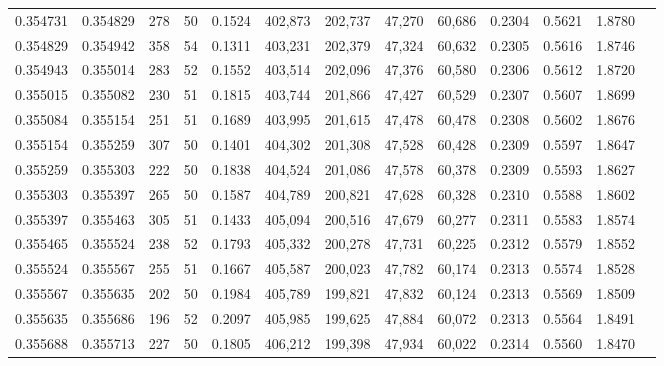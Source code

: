 \begin{tabular}{rrrrrrrrrrrrr}
0.354731 & 0.354829 &   278 &  50 &                                     0.1524 & 402,873 & 202,737 &  47,270 &  60,686 & 0.2304 & 0.5621 & 1.8780 \\
0.354829 & 0.354942 &   358 &  54 &                                     0.1311 & 403,231 & 202,379 &  47,324 &  60,632 & 0.2305 & 0.5616 & 1.8746 \\
0.354943 & 0.355014 &   283 &  52 &                                     0.1552 & 403,514 & 202,096 &  47,376 &  60,580 & 0.2306 & 0.5612 & 1.8720 \\
0.355015 & 0.355082 &   230 &  51 &                                     0.1815 & 403,744 & 201,866 &  47,427 &  60,529 & 0.2307 & 0.5607 & 1.8699 \\
0.355084 & 0.355154 &   251 &  51 &                                     0.1689 & 403,995 & 201,615 &  47,478 &  60,478 & 0.2308 & 0.5602 & 1.8676 \\
0.355154 & 0.355259 &   307 &  50 &                                     0.1401 & 404,302 & 201,308 &  47,528 &  60,428 & 0.2309 & 0.5597 & 1.8647 \\
0.355259 & 0.355303 &   222 &  50 &                                     0.1838 & 404,524 & 201,086 &  47,578 &  60,378 & 0.2309 & 0.5593 & 1.8627 \\
0.355303 & 0.355397 &   265 &  50 &                                     0.1587 & 404,789 & 200,821 &  47,628 &  60,328 & 0.2310 & 0.5588 & 1.8602 \\
0.355397 & 0.355463 &   305 &  51 &                                     0.1433 & 405,094 & 200,516 &  47,679 &  60,277 & 0.2311 & 0.5583 & 1.8574 \\
0.355465 & 0.355524 &   238 &  52 &                                     0.1793 & 405,332 & 200,278 &  47,731 &  60,225 & 0.2312 & 0.5579 & 1.8552 \\
0.355524 & 0.355567 &   255 &  51 &                                     0.1667 & 405,587 & 200,023 &  47,782 &  60,174 & 0.2313 & 0.5574 & 1.8528 \\
0.355567 & 0.355635 &   202 &  50 &                                     0.1984 & 405,789 & 199,821 &  47,832 &  60,124 & 0.2313 & 0.5569 & 1.8509 \\
0.355635 & 0.355686 &   196 &  52 &                                     0.2097 & 405,985 & 199,625 &  47,884 &  60,072 & 0.2313 & 0.5564 & 1.8491 \\
0.355688 & 0.355713 &   227 &  50 &                                     0.1805 & 406,212 & 199,398 &  47,934 &  60,022 & 0.2314 & 0.5560 & 1.8470 \\

\end{tabular}
